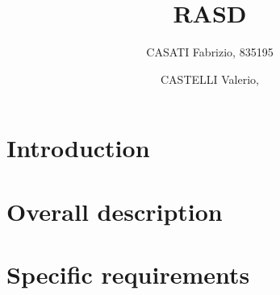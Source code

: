 




\title{RASD}
\author{
	CASATI Fabrizio, 835195
	\and
	CASTELLI Valerio, 
}

\maketitle
\tableofcontents

\chapter{Introduction}


\chapter{Overall description}


\chapter{Specific requirements}


